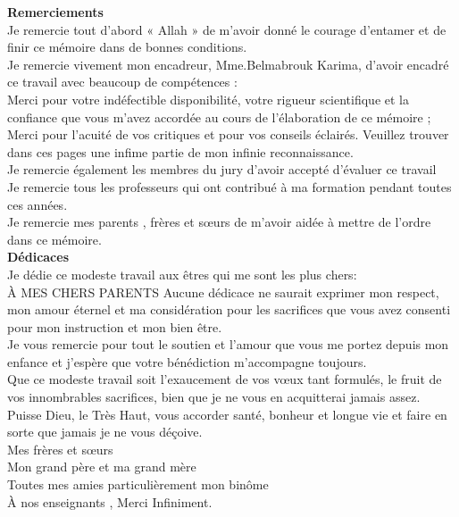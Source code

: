 \documentclass[12pt, openany]{report}
\begin{document}
\baselineskip=2.0pt
\begin{titlepage}
  \begin{sffamily}
  \begin{center}
  \renewcommand{\baselinestretch}{1.5}



    \textbf{\huge Remerciements}\\[0.7cm]
     
    \LARGE Je remercie tout d’abord « Allah » de m’avoir donné le courage d’entamer et de finir ce mémoire dans de bonnes conditions.
\\
Je remercie vivement mon encadreur, Mme.Belmabrouk Karima, d’avoir encadré ce travail avec beaucoup de compétences :
\\
Merci pour votre indéfectible disponibilité, votre rigueur scientifique et la confiance que vous m’avez accordée au cours de l’élaboration de ce mémoire ; Merci pour l’acuité de vos critiques et pour vos conseils éclairés.
Veuillez trouver dans ces pages une infime partie de mon infinie reconnaissance.
\\
Je remercie également les membres du jury d’avoir accepté d’évaluer ce travail
\\
Je remercie tous les professeurs qui ont contribué à ma formation pendant toutes ces années.
\\
Je remercie mes parents , frères et sœurs de m'avoir aidée à mettre de l’ordre dans ce mémoire.
\\  
\newpage
  \textbf{\huge 
Dédicaces}\\[0.7cm]

Je dédie ce modeste travail aux êtres qui me sont les plus chers:\\

À MES CHERS PARENTS
Aucune dédicace ne saurait exprimer mon respect, mon amour éternel et ma considération pour les sacrifices que vous avez consenti pour mon instruction et mon bien être.\\
Je vous remercie pour tout le soutien et l’amour que vous me portez depuis mon enfance et j’espère que votre bénédiction m’accompagne toujours.\\
Que ce modeste travail soit l’exaucement de vos vœux tant formulés, le fruit de vos innombrables sacrifices, bien que je ne vous en acquitterai jamais assez.\\
Puisse Dieu, le Très Haut, vous accorder santé, bonheur et longue vie et faire en sorte que jamais je ne vous déçoive.\\
Mes frères et sœurs
\\
Mon grand père et ma grand mère
\\
Toutes mes amies particulièrement mon binôme
\\
À nos enseignants , Merci Infiniment.
    \end{center}
    \end{sffamily}
    \end{titlepage}
    
\end{document}
